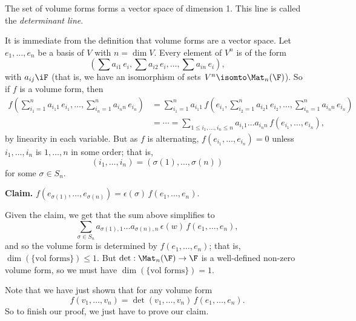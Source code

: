 \begin{theorem}
	 The set of volume forms forms a vector space of dimension 1. This line is called the \emph{determinant line}. %
\end{theorem}

\begin{proof*}
	It is immediate from the definition that volume forms are a vector space. Let $e_1,\ldots,e_n$ be a basis of $V$ with $n=\dim V$. Every element of $V^n$ is of the form %
	\begin{equation*}
		\left( \sum a_{i1} \,e_i, \sum a_{i2}\,e_i, \ldots, \sum a_{in}\,e_i \right),
	\end{equation*}
	with $a_{ij}\iF$ (that is, we have an isomorphism of sets $V^n \isomto \Mat_n(\F)$). So if $f$ is a volume form, then %
	\begin{align*}
		   f\left( \sum_{i_1=1}^n a_{i_1 1}\, e_{i_1}, \ldots, \sum_{i_n=1}^n a_{i_n n}\,e_{i_n} \right) %
		&= \sum_{i_1=1}^n a_{i_1 1} \,f\left( e_{i_1}, \sum_{i_2=1}^n a_{i_2 1}\, e_{i_2}, \ldots, \sum_{i_n=1}^n a_{i_n n}\,e_{i_n} \right) \\ %
		&= \cdots = \sum_{1\leq i_1,\ldots,i_n\leq n} a_{i_1 1} \ldots a_{i_n n} \, f(e_{i_1},\ldots,e_{i_n}), %
	\end{align*}
	by linearity in each variable. But as $f$ is alternating, $f(e_{i_1},\ldots,e_{i_n})=0$ unless $i_1,\ldots,i_n$ is $1,\ldots,n$ in some order; that is, %
	\begin{equation*}
		\left( i_1,\ldots,i_n \right) = \left( \sigma(1),\ldots,\sigma(n) \right)
	\end{equation*}
	for some $\sigma\in S_n$.
	
	
	\textbf{Claim.} $f(e_{\sigma(1)},\ldots,e_{\sigma(n)})=\epsilon(\sigma) \,f(e_1,\ldots,e_n)$. %
	
	Given the claim, we get that the sum above simplifies to
	\begin{equation*}
		\sum_{\sigma\in S_n} a_{\sigma(1),1} \ldots a_{\sigma(n),n} \, \epsilon(w)\,f(e_1,\ldots,e_n), %
	\end{equation*}
	and so the volume form is determined by $f(e_1,\ldots,e_n)$; that is, $\dim(\{\text{vol forms}\})\leq 1$. But $\det:\Mat_n(\F) \to \F$ is a well-defined non-zero volume form, so we must have $\dim(\{\text{vol forms}\}) = 1$. %
\end{proof*}

Note that we have just shown that for any volume form
\begin{equation*}
	f(v_1,\ldots,v_n) = \det(v_1,\ldots,v_n)\,f(e_1,\ldots,e_n).
\end{equation*}
So to finish our proof,  we just have to prove our claim.

